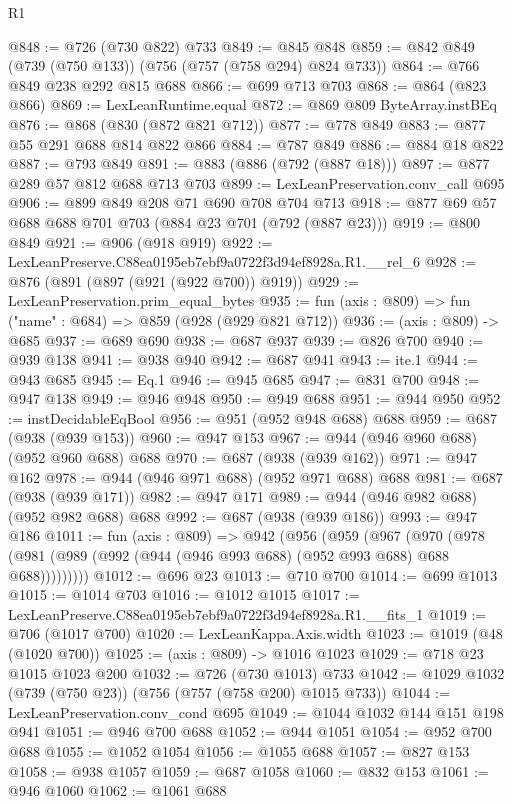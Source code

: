 \begin{lexlean}{R1}
\begin{coremodule}
@848 := @726 (@730 @822) @733
@849 := @845 @848
@859 := @842 @849 (@739 (@750 @133)) (@756 (@757 (@758 @294) @824 @733))
@864 := @766 @849 @238 @292 @815 @688
@866 := @699 @713 @703
@868 := @864 (@823 @866)
@869 := LexLeanRuntime.equal
@872 := @869 @809 ByteArray.instBEq
@876 := @868 (@830 (@872 @821 @712))
@877 := @778 @849
@883 := @877 @55 @291 @688 @814 @822 @866
@884 := @787 @849
@886 := @884 @18 @822
@887 := @793 @849
@891 := @883 (@886 (@792 (@887 @18)))
@897 := @877 @289 @57 @812 @688 @713 @703
@899 := LexLeanPreservation.conv_call @695
@906 := @899 @849 @208 @71 @690 @708 @704 @713
@918 := @877 @69 @57 @688 @688 @701 @703 (@884 @23 @701 (@792 (@887 @23)))
@919 := @800 @849
@921 := @906 (@918 @919)
@922 := LexLeanPreserve.C88ea0195eb7ebf9a0722f3d94ef8928a.R1.__rel_6
@928 := @876 (@891 (@897 (@921 (@922 @700)) @919))
@929 := LexLeanPreservation.prim_equal_bytes
@935 := fun (axis : @809) => fun ("name" : @684) => @859 (@928 (@929 @821 @712))
@936 := (axis : @809) -> @685
@937 := @689 @690
@938 := @687 @937
@939 := @826 @700
@940 := @939 @138
@941 := @938 @940
@942 := @687 @941
@943 := ite.{1}
@944 := @943 @685
@945 := Eq.{1}
@946 := @945 @685
@947 := @831 @700
@948 := @947 @138
@949 := @946 @948
@950 := @949 @688
@951 := @944 @950
@952 := instDecidableEqBool
@956 := @951 (@952 @948 @688) @688
@959 := @687 (@938 (@939 @153))
@960 := @947 @153
@967 := @944 (@946 @960 @688) (@952 @960 @688) @688
@970 := @687 (@938 (@939 @162))
@971 := @947 @162
@978 := @944 (@946 @971 @688) (@952 @971 @688) @688
@981 := @687 (@938 (@939 @171))
@982 := @947 @171
@989 := @944 (@946 @982 @688) (@952 @982 @688) @688
@992 := @687 (@938 (@939 @186))
@993 := @947 @186
@1011 := fun (axis : @809) =>
  @942
    (@956
      (@959
        (@967
          (@970 (@978 (@981 (@989 (@992 (@944 (@946 @993 @688) (@952 @993 @688) @688 @688)))))))))
@1012 := @696 @23
@1013 := @710 @700
@1014 := @699 @1013
@1015 := @1014 @703
@1016 := @1012 @1015
@1017 := LexLeanPreserve.C88ea0195eb7ebf9a0722f3d94ef8928a.R1.__fits_1
@1019 := @706 (@1017 @700)
@1020 := LexLeanKappa.Axis.width
@1023 := @1019 (@48 (@1020 @700))
@1025 := (axis : @809) -> @1016 @1023
@1029 := @718 @23 @1015 @1023 @200
@1032 := @726 (@730 @1013) @733
@1042 := @1029 @1032 (@739 (@750 @23)) (@756 (@757 (@758 @200) @1015 @733))
@1044 := LexLeanPreservation.conv_cond @695
@1049 := @1044 @1032 @144 @151 @198 @941
@1051 := @946 @700 @688
@1052 := @944 @1051
@1054 := @952 @700 @688
@1055 := @1052 @1054
@1056 := @1055 @688
@1057 := @827 @153
@1058 := @938 @1057
@1059 := @687 @1058
@1060 := @832 @153
@1061 := @946 @1060
@1062 := @1061 @688

\end{coremodule}
\end{lexlean}
